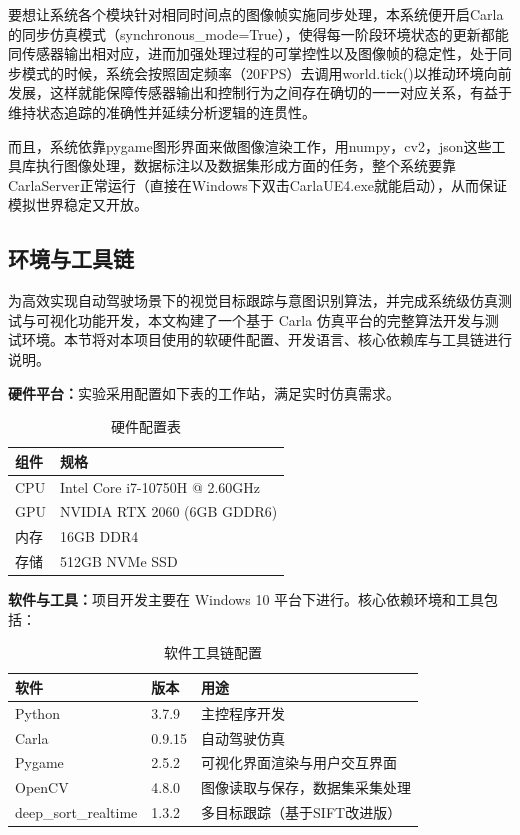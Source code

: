 要想让系统各个模块针对相同时间点的图像帧实施同步处理，本系统便开启Carla的同步仿真模式（synchronous\_mode=True），使得每一阶段环境状态的更新都能同传感器输出相对应，进而加强处理过程的可掌控性以及图像帧的稳定性，处于同步模式的时候，系统会按照固定频率（20FPS）去调用world.tick()以推动环境向前发展，这样就能保障传感器输出和控制行为之间存在确切的一一对应关系，有益于维持状态追踪的准确性并延续分析逻辑的连贯性。

而且，系统依靠pygame图形界面来做图像渲染工作，用numpy，cv2，json这些工具库执行图像处理，数据标注以及数据集形成方面的任务，整个系统要靠CarlaServer正常运行（直接在Windows下双击CarlaUE4.exe就能启动），从而保证模拟世界稳定又开放。

\subsection{环境与工具链}

为高效实现自动驾驶场景下的视觉目标跟踪与意图识别算法，并完成系统级仿真测试与可视化功能开发，本文构建了一个基于 Carla 仿真平台的完整算法开发与测试环境。本节将对本项目使用的软硬件配置、开发语言、核心依赖库与工具链进行说明。

\textbf{硬件平台：}实验采用配置如下表的工作站，满足实时仿真需求。

\begin{table}[H]
	\caption{硬件配置表}
	\label{tab:hardware_config}
	\centering
	\begin{tabular}{ll}
		\toprule
		组件 & 规格 \\
		\midrule
		CPU & Intel Core i7-10750H @ 2.60GHz \\
		GPU & NVIDIA RTX 2060 (6GB GDDR6) \\
		内存 & 16GB DDR4 \\
		存储 & 512GB NVMe SSD \\
		\bottomrule
	\end{tabular}
\end{table}

\textbf{软件与工具：}项目开发主要在 Windows 10 平台下进行。核心依赖环境和工具包括：

\begin{table}[H]
	\caption{软件工具链配置}
	\label{tab:software_stack}
	\centering
	\begin{tabular}{lll}
		\toprule
		软件 & 版本 & 用途 \\
		\midrule
		Python & 3.7.9 & 主控程序开发 \\
		Carla & 0.9.15 & 自动驾驶仿真 \\
		Pygame & 2.5.2 & 可视化界面渲染与用户交互界面 \\
		OpenCV & 4.8.0 & 图像读取与保存，数据集采集处理 \\
		deep\_sort\_realtime & 1.3.2 & 多目标跟踪（基于SIFT改进版） \\
		\bottomrule
	\end{tabular}
\end{table}

